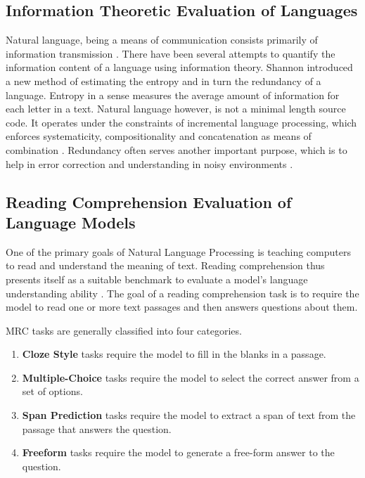 \subsection{Information Theoretic Evaluation of Languages}
Natural language, being a means of communication consists primarily of information transmission \cite{debowskiInformationTheoryLanguage2020}. There have
been several attempts to quantify the information content of a language using information theory. Shannon \cite{shannonPredictionEntropyPrinted1951} introduced a new
method of estimating the entropy and in turn the redundancy of a language. Entropy in a sense measures the average amount of information for each letter in a text.
Natural language however, is not a minimal length source code. It operates under the constraints of incremental language processing, which enforces
systematicity, compositionality and concatenation as means of combination  \cite{futrellInformationTheoryBridge2022}. Redundancy often serves another
important purpose, which is to help in error correction and understanding in noisy environments \cite{gibsonHowEfficiencyShapes2019}.

\subsection{Reading Comprehension Evaluation of Language Models}
One of the primary goals of Natural Language Processing is teaching computers to read and understand the meaning of text. Reading comprehension 
thus presents itself as a suitable benchmark to evaluate a model's language understanding ability \cite{zengSurveyMachineReading2020}.  The goal 
of a reading comprehension task is to require the model to read one or more text passages and then answers questions about them. 

MRC tasks are generally classified into four categories. 
\begin{enumerate}
    \item \textbf{Cloze Style} tasks require the model to fill in the blanks in a passage. 
    \item \textbf{Multiple-Choice} tasks require the model to select the correct answer from a set of options.
    \item \textbf{Span Prediction} tasks require the model to extract a span of text from the passage that answers the question.
    \item \textbf{Freeform} tasks require the model to generate a free-form answer to the question.
\end{enumerate}

